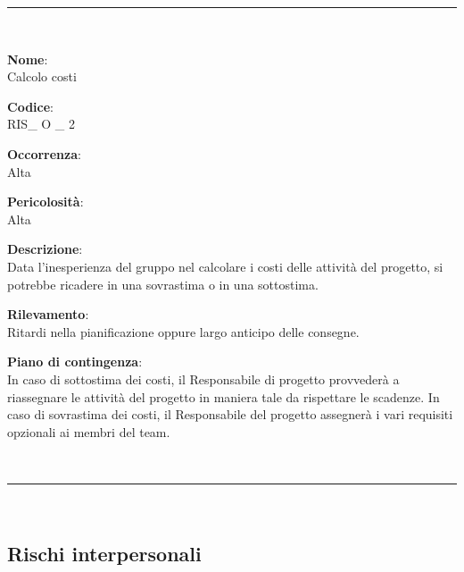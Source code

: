 \noindent\rule{\textwidth}{1pt}\\

{\setlength{\parindent}{0cm}
\begin{minipage}{\textwidth} 
\begin{multicols}{4}
\textbf{Nome}: \\ Calcolo costi \columnbreak

\textbf{Codice}: \\ RIS\_ O \_ 2 
\columnbreak

\textbf{Occorrenza}: \\ Alta 
\columnbreak

\textbf{Pericolosità}: \\ Alta

\end{multicols}

\begin{multicols}{3}

\textbf{Descrizione}: \\ Data l'inesperienza del gruppo nel calcolare i costi delle attività del progetto, si potrebbe ricadere in una sovrastima o in una sottostima.
\columnbreak

\textbf{Rilevamento}: \\ Ritardi nella pianificazione oppure largo anticipo delle consegne.
\columnbreak

\textbf{Piano di contingenza}: \\ In caso di sottostima dei costi, il Responsabile di progetto provvederà a riassegnare le attività del progetto in maniera tale da rispettare le scadenze. In caso di sovrastima dei costi, il Responsabile del progetto assegnerà i vari requisiti opzionali ai membri del team.
\\

\columnbreak
\end{multicols}
\end{minipage}} \\

\noindent\rule{\textwidth}{1pt}\\

\subsection{Rischi interpersonali}


